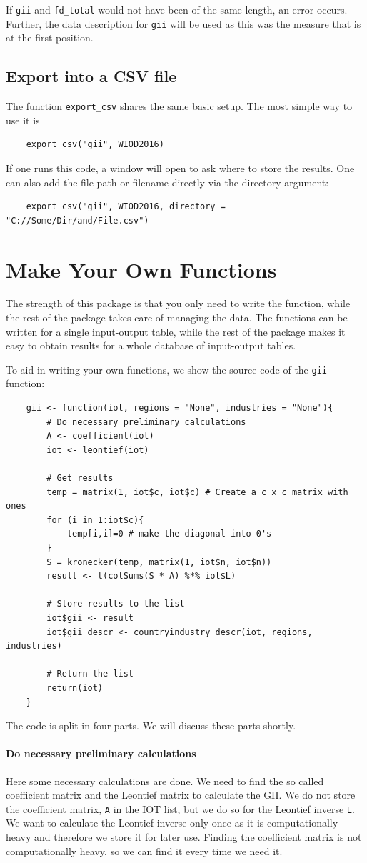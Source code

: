 \documentclass[10pt,a4paper]{paper}
\begin{document}
	If \texttt{gii} and \texttt{fd\_total} would not have been of the same length, an error occurs. Further, the data description for \texttt{gii} will be used as this was the measure that is at the first position.
	
	\subsection{Export into a CSV file}
	The function \texttt{export\_csv} shares the same basic setup. The most simple way to use it is
	\begin{Verbatim}
	export_csv("gii", WIOD2016)
	\end{Verbatim}
	If one runs this code, a window will open to ask where to store the results. One can also add the file-path or filename directly via the directory argument:
	\begin{Verbatim}
	export_csv("gii", WIOD2016, directory = "C://Some/Dir/and/File.csv")
	\end{Verbatim}
	\section{Make Your Own Functions}
	\label{sec:ownfunction}
	The strength of this package is that you only need to write the function, while the rest of the package takes care of managing the data. The functions can be written for a single input-output table, while the rest of the package makes it easy to obtain results for a whole database of input-output tables.
	
	To aid in writing your own functions, we show the source code of the \texttt{gii} function:
	\begin{Verbatim}
	gii <- function(iot, regions = "None", industries = "None"){
		# Do necessary preliminary calculations
		A <- coefficient(iot)
		iot <- leontief(iot)
	
		# Get results
		temp = matrix(1, iot$c, iot$c) # Create a c x c matrix with ones
		for (i in 1:iot$c){
			temp[i,i]=0 # make the diagonal into 0's
		}
		S = kronecker(temp, matrix(1, iot$n, iot$n)) 
		result <- t(colSums(S * A) %*% iot$L) 
		
		# Store results to the list
		iot$gii <- result	
		iot$gii_descr <- countryindustry_descr(iot, regions, industries)
		
		# Return the list
		return(iot)
	}	
	\end{Verbatim}
	The code is split in four parts. We will discuss these parts shortly.
	
	\paragraph{Do necessary preliminary calculations} Here some necessary calculations are done. We need to find the so called coefficient matrix and the Leontief matrix to calculate the GII. We do not store the coefficient matrix, \texttt{A} in the IOT list, but we do so for the Leontief inverse \texttt{L}. We want to calculate the Leontief inverse only once as it is computationally heavy and therefore we store it for later use. Finding the coefficient matrix is not computationally heavy, so we can find it every time we need it.
	
\end{document}

